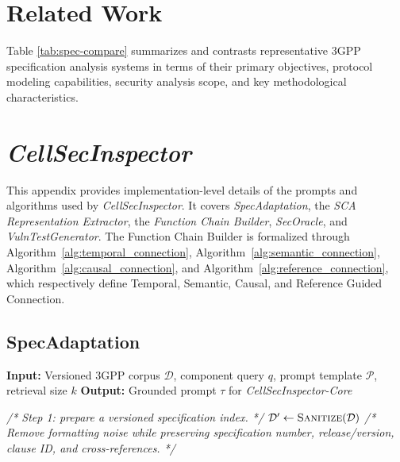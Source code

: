 \documentclass[sigconf]{acmart}
\newcommand{\lm}{\textit{CellSecInspector}\xspace}
\newcommand{\core}{\textit{CellSecInspector-Core}\xspace}
\begin{document}
{%


\vspace{-5pt}

\section{Related Work}
\label{append:Related_Work}
Table \ref{tab:spec-compare} summarizes and contrasts representative 3GPP specification analysis systems in terms of their primary objectives, protocol modeling capabilities, security analysis scope, and key methodological characteristics.



\section{\textit{\lm}}
\label{append:prompt_algorithm}
This appendix provides implementation-level details of the prompts and algorithms used by \lm. It covers \textit{SpecAdaptation}, the \textit{SCA Representation Extractor}, the \textit{Function Chain Builder}, \textit{SecOracle}, and \textit{VulnTestGenerator}. The Function Chain Builder is formalized through Algorithm~\ref{alg:temporal_connection}, Algorithm~\ref{alg:semantic_connection}, Algorithm~\ref{alg:causal_connection}, and Algorithm~\ref{alg:reference_connection}, which respectively define Temporal, Semantic, Causal, and Reference Guided Connection.

\subsection{SpecAdaptation}

\vspace{-5pt}

\begin{algorithm}[ht]
\caption{\textit{SpecAdaptation}}
\label{alg:rag_prompt}
\scriptsize
\begin{algorithmic}[1]

\State \textbf{Input:} Versioned 3GPP corpus $\mathcal{D}$, component query $q$, prompt template $\mathcal{P}$, retrieval size $k$
\State \textbf{Output:} Grounded prompt $\tau$ for \core

\State \textit{/* Step 1: prepare a versioned specification index. */}
\State $\mathcal{D}' \leftarrow \textsc{Sanitize}(\mathcal{D})$
\State \textit{/* Remove formatting noise while preserving specification number, release/version, clause ID, and cross-references. */}


\end{algorithmic}
\end{algorithm}}
\end{document}
